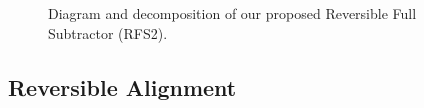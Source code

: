 \documentclass[%
reprint,
 amsmath,amssymb,
 aps,
]{revtex4-1}
\begin{document}
\begin{figure}%


\begin{minipage}{2.1in}%
\raggedright
{}
\end{minipage}%
\hspace{7em}
\parbox{1.2in}{
}%

\caption{Diagram and decomposition of our proposed Reversible Full Subtractor (RFS2).}%
\label{fig:proposed RFS2}%
\end{figure}


\subsection{Reversible Alignment} 
\end{document}
